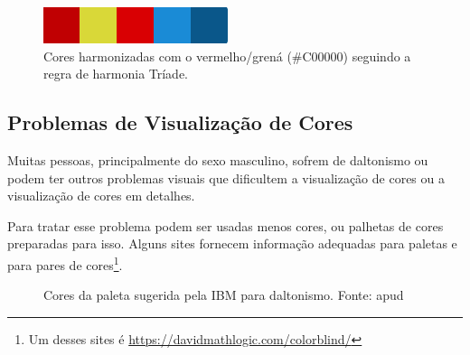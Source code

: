 \begin{figure}
    \centering
    \includegraphics[width=\tam\linewidth]{imagens/coresdovermelhao}
    \caption{Cores harmonizadas com o vermelho/grená (\#C00000) seguindo a regra de harmonia Tríade.}
    \label{fig:coresdovermelhao}
\end{figure}

\subsection{Problemas de Visualização de Cores}

Muitas pessoas, principalmente do sexo masculino, sofrem de daltonismo ou podem ter outros problemas visuais que dificultem a visualização de cores ou a visualização de cores em detalhes.

Para tratar esse problema podem ser usadas menos cores, ou palhetas de cores preparadas para isso. Alguns sites fornecem informação adequadas para paletas e para pares de cores\footnote{Um desses sites é \url{https://davidmathlogic.com/colorblind/}}.

\begin{figure}[hbt]
\centering
{}
\caption{Cores da paleta sugerida pela IBM para daltonismo. Fonte: \citep{ibmcolor} apud \citep{color}}
\end{figure}


